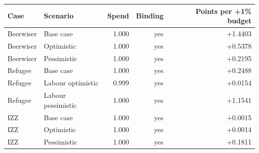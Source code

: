 \begin{tabular}{llrrr}
\toprule
Case & Scenario & Spend & Binding & Points per +1\% budget \\
\midrule
Beerwiser & Base case & 1.000 & yes & +1.4403 \\
Beerwiser & Optimistic & 1.000 & yes & +0.5378 \\
Beerwiser & Pessimistic & 1.000 & yes & +0.2195 \\
Refugee & Base case & 1.000 & yes & +0.2488 \\
Refugee & Labour optimistic & 0.999 & yes & +0.0154 \\
Refugee & Labour pessimistic & 1.000 & yes & +1.1541 \\
IZZ & Base case & 1.000 & yes & +0.0015 \\
IZZ & Optimistic & 1.000 & yes & +0.0014 \\
IZZ & Pessimistic & 1.000 & yes & +0.1811 \\
\bottomrule
\end{tabular}